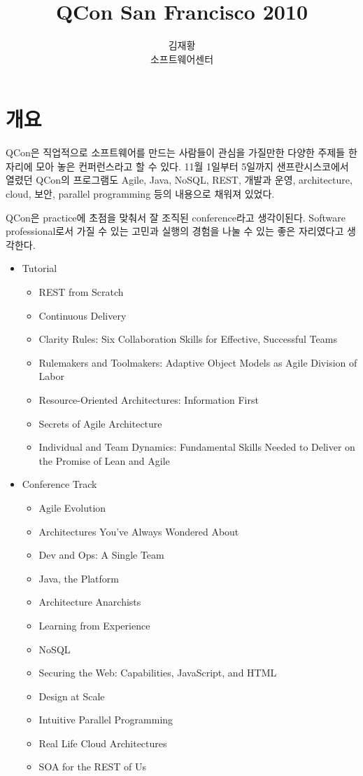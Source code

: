 \documentclass[11pt]{article}
\title{QCon San Francisco 2010}
\author{김재황 \\ 소프트웨어센터}
\begin{document}
\maketitle

\section{개요}

QCon은 직업적으로 소프트웨어를 만드는 사람들이 관심을 가질만한 
다양한 주제들 한 자리에 모아 놓은 컨퍼런스라고 할 수 있다. 
11월 1일부터 5일까지 샌프란시스코에서 열렸던 QCon의 프로그램도 Agile, Java, 
NoSQL, REST, 개발과 운영, architecture, cloud, 보안, parallel programming
등의 내용으로 채워져 있었다. 

QCon은 practice에 초점을 맞춰서 잘 조직된 conference라고 생각이된다. Software 
professional로서 가질 수 있는 고민과 실행의 경험을 나눌 수 있는 좋은 
자리였다고 생각한다.

\begin{itemize}
\item Tutorial
    \begin{itemize}
    \item REST from Scratch
    \item Continuous Delivery
    \item  Clarity Rules: Six Collaboration Skills for Effective, Successful Teams
    \item Rulemakers and Toolmakers: Adaptive Object Models as Agile Division of Labor
    \item Resource-Oriented Architectures: Information First
    \item Secrets of Agile Architecture
    \item Individual and Team Dynamics: Fundamental Skills Needed to Deliver on the Promise of Lean and Agile
    \end{itemize}
\item Conference Track
    \begin{itemize}
    \item Agile Evolution
    \item Architectures You've Always Wondered About
    \item Dev and Ops: A Single Team
    \item Java, the Platform
    \item Architecture Anarchists
    \item Learning from Experience
    \item NoSQL
    \item Securing the Web: Capabilities, JavaScript, and HTML
    \item Design at Scale
    \item Intuitive Parallel Programming
    \item Real Life Cloud Architectures
    \item SOA for the REST of Us
    \end{itemize}
\end{itemize}
\end{document}
